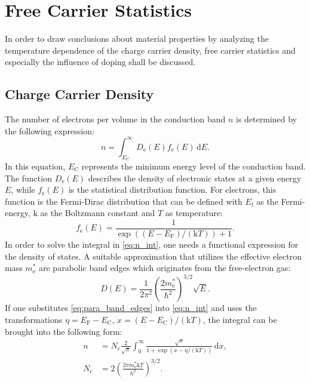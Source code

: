 \section{Free Carrier Statistics}
In order to draw conclusions about material properties by analyzing
the temperature dependence of the charge carrier density,
free carrier statistics and especially the influence of doping shall be
discussed.
\subsection{Charge Carrier Density}
The number of electrons per volume in the conduction band $n$ is
determined by the following expression:
\begin{equation}
	n=\int _{E_{\mathrm{C}}}^{\infty} D_{\mathrm{e}}(E)
	f_{\mathrm{e}}(E)\, \mathrm{d}E.
	\label{eq:n_int}
\end{equation}
In this equation, $E_{\mathrm{C}}$ represents the minimum energy level of
the conduction band. The function $D_{\mathrm{e}}(E)$ describes
the density of electronic states at a given energy $E$, while
$f_{\mathrm{e}}(E)$ is the statistical distribution function.
For electrons, this function is the Fermi-Dirac distribution that can be
defined with $E_\mathrm{f}$ as the Fermi-energy, $\mathrm{k}$ as the
Boltzmann constant and $T$ as temperature:
\begin{equation}
	f_{\mathrm{e}}(E)
	=\frac{1}{\exp((E-E_{\mathrm{F}})/(\mathrm{k}T))+1}.
\end{equation}
In order to solve the integral in \cref{eq:n_int}, one needs a functional
expression for the density of states.
A suitable approximation that utilizes the effective electron mass
$m^*_\mathrm{e}$ are
parabolic band edges which originates from the free-electron gas:
\begin{equation}
	D(E)=\frac{1}{2\pi^2}
	\left( \frac{2m^*_\mathrm{e}}{\hbar^2} \right)^{3 / 2} \sqrt{E}.
	\label{eq:para_band_edges}
\end{equation}
If one substitutes \cref{eq:para_band_edges} into \cref{eq:n_int} and uses
the transformations $\eta=E_\mathrm{F}-E_\mathrm{C}$,
$x = (E-E_\mathrm{C}) / (\mathrm{k} T)$, the integral can be brought into
the following form:
\begin{align}
	n            & = N_\mathrm{c} \frac{2}{\sqrt{\pi}}
	\int_{0}^{\infty} \frac{\sqrt{ x }}{1+\exp(x-\eta / (\mathrm{k}T))} \,
	\mathrm{d}x \label{eq:n_int_2},                                        \\
	N_\mathrm{c} & = 2 \left( \frac{2 \pi m^*_\mathrm{e} \mathrm{k}T}{h^2}
	\right)^{3 / 2}.
\end{align}
